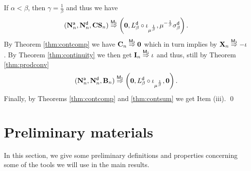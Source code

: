 \documentclass[]{amsart}
\numberwithin{equation}{section}
\theoremstyle{remark}
\theoremstyle{definition}
\begin{document}
	If $\alpha<\beta$, then $\gamma=\frac{1}{\beta}$ and thus we have
	\begin{equation*}
		(\mathbf{N}^{\sf a}_n,\mathbf{N}^{\sf d}_n,\mathbf{ CS}_n) \overset{\sf M_1}{\Rightarrow} \left(\mathbf{0},L_\beta^{\sf d}\circ \iota_{\mu^{\frac{1}{\beta}}},\mu^{-\frac{1}{\beta}}\sigma_\beta^{\sf d}\right).
	\end{equation*}
	By Theorem \ref{thm:contcomp} we have $\mathbf{C}_n \overset{\sf M_1}{\Rightarrow} \mathbf{0}$ which in turn implies by $\mathbf{X}_n \overset{\sf M_1}{\Rightarrow} -\iota$. By Theorem \ref{thm:continuity} we then get $\mathbf{I}_n \overset{\sf M_1}{\Rightarrow} \iota$ and thus, still by Theorem \ref{thm:prodconv}
	\begin{equation*}
		(\mathbf{N}^{\sf a}_n,\mathbf{N}^{\sf d}_n,\mathbf{B}_n) \overset{\sf M_1}{\Rightarrow} \left(\mathbf{0},L_\beta^{\sf d}\circ \iota_{\mu^{\frac{1}{\beta}}},\mathbf{0}\right).
	\end{equation*}
	Finally, by Theorems \ref{thm:contcomp} and \ref{thm:contsum} we get Item (iii).
\hfill \qed

\appendix
\section{Preliminary materials}\label{app:A}
In this section, we give some preliminary definitions and properties concerning some of the tools we will use in the main results. 
\end{document}
